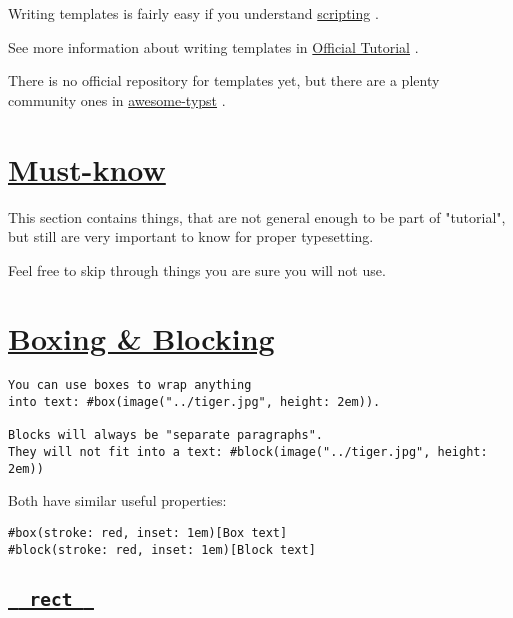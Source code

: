 Writing templates is fairly easy if you understand
\href{basics/tutorial/../scripting/index.html}{scripting} .

See more information about writing templates in
\href{https://typst.app/docs/tutorial/making-a-template/}{Official
Tutorial} .

There is no official repository for templates yet, but there are a
plenty community ones in
\href{https://github.com/qjcg/awesome-typst?ysclid=lj8pur1am7431908794\#general}{awesome-typst}
.

\section{\texorpdfstring{\hyperref[must-know]{Must-know}}{Must-know}}\label{must-know}

This section contains things, that are not general enough to be part of
"tutorial", but still are very important to know for proper typesetting.

Feel free to skip through things you are sure you will not use.

\section{\texorpdfstring{\hyperref[boxing--blocking]{Boxing \&
Blocking}}{Boxing \& Blocking}}\label{boxing--blocking}

\begin{verbatim}
You can use boxes to wrap anything
into text: #box(image("../tiger.jpg", height: 2em)).

Blocks will always be "separate paragraphs".
They will not fit into a text: #block(image("../tiger.jpg", height: 2em))
\end{verbatim}

\pandocbounded{}

Both have similar useful properties:

\begin{verbatim}
#box(stroke: red, inset: 1em)[Box text]
#block(stroke: red, inset: 1em)[Block text]
\end{verbatim}

\pandocbounded{}

\subsection{\texorpdfstring{\hyperref[rect]{\texttt{\ }{\texttt{\ rect\ }}\texttt{\ }}}{  rect  }}\label{rect}

